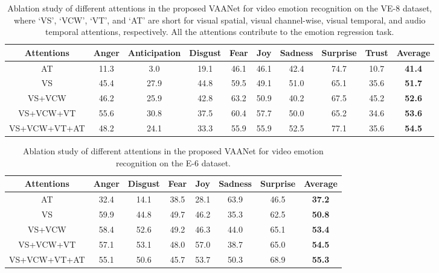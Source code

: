 \documentclass[letterpaper]{article} \usepackage{aaai20}  \usepackage{times}  \usepackage{helvet} \usepackage{courier}  \usepackage[hyphens]{url}  \usepackage{graphicx} \urlstyle{rm} \def\UrlFont{\rm}  \usepackage{graphicx}
\begin{document}
\begin{center}
\begin{table*}[!t]
\centering \caption{Ablation study of different attentions in the proposed VAANet for video emotion recognition on the VE-8 dataset, where `VS', `VCW', `VT', and `AT' are short for visual spatial, visual channel-wise, visual temporal, and audio temporal attentions, respectively. All the attentions contribute to the emotion regression task.}
\begin{tabular}{cccccccccc}
\toprule
Attentions & Anger & Anticipation & Disgust & Fear & Joy & Sadness & Surprise & Trust & \textbf{Average} \\
\hline
AT           &   11.3    &      3.0        &    19.1     &      46.1&  46.1   &    42.4   & 74.7        &10.7       &     \textbf{41.4}    \\
VS           &  45.4   &    27.9          &     44.8    &  59.5    &    49.1 &51.0         &    65.1      &     35.6  &     \textbf{51.7}    \\
VS+VCW       &   46.2    &      25.9        &   42.8      & 63.2     & 50.9    &    40.2     & 67.5         &  45.2     &  \textbf{52.6}       \\
VS+VCW+VT   &   55.6    &      30.8        &   37.5      & 60.4     & 57.7    &50.0         &      65.2    & 34.6      & \textbf{53.6}        \\
VS+VCW+VT+AT &   48.2    &      24.1        &   33.3      &     55.9 & 55.9    &    52.5     &      77.1    &  35.6     &       \textbf{54.5}  \\
\bottomrule
\end{tabular}
\label{tab:Ablation_Attention_VideoEmotion}
\end{table*}
\end{center}



\begin{table*}[!t]
\centering \caption{Ablation study of different attentions in the proposed VAANet for video emotion recognition on the E-6 dataset.}
\begin{tabular}{cccccccc}
\toprule
Attentions & Anger & Disgust & Fear & Joy & Sadness & Surprise & \textbf{Average} \\
\hline
AT           &   32.4   &      14.1        &   38.5      & 28.1     &  63.9   &    46.5     & \textbf{37.2}  \\
VS           &   59.9    &      44.8        &   49.7      &     46.2 &  35.3   &    62.5     & \textbf{50.8}  \\
VS+VCW  &  58.4     &       52.6       &    49.2     &  46.3    &  44.0   &     65.1    &  \textbf{53.4}  \\
VS+VCW+VT    &   57.1    &      53.1        &   48.0      &     57.0 & 38.7    &    65.0     &  \textbf{54.5}  \\
VS+VCW+VT+AT &   55.1    &      50.6        &   45.7      &     53.7 &  50.3   &    68.9     &  \textbf{55.3} \\
\bottomrule
\end{tabular}
\label{tab:Ablation_Attention_Ekman}
\end{table*}
\end{document}
